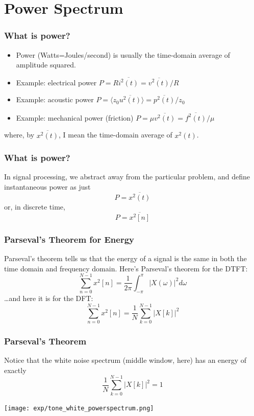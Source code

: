 \documentclass{beamer}
\begin{document}
\section[Power]{Power Spectrum}
\setcounter{subsection}{1}

\begin{frame}
  \frametitle{What is power?}

  \begin{itemize}
    \item Power (Watts=Joules/second) is usually the time-domain
      average of amplitude squared.
    \item Example: electrical power $P=R\overline{i^2(t)} = \overline{v^2(t)}/R$
    \item Example: acoustic power $P=\langle z_0 \overline{u^2(t)}\rangle = \overline{p^2(t)}/z_0$
    \item Example: mechanical power (friction) $P= \mu\overline{v^2(t)} = \overline{f^2(t)}/\mu$
  \end{itemize}
  where, by $\overline{x^2(t)}$, I mean the time-domain average of $x^2(t)$.
\end{frame}

\begin{frame}
  \frametitle{What is power?}

  In signal processing, we abstract away from the particular problem,
  and define instantaneous power as just
  \[
  P = \overline{x^2(t)}
  \]
  or, in  discrete time,
  \[
  P = \overline{x^2[n]}
  \]
\end{frame}
  
\begin{frame}
  \frametitle{Parseval's Theorem for Energy}

  Parseval's theorem tells us that the energy of a signal is the same
  in both the time domain and frequency domain.  Here's Parseval's
  theorem for the DTFT:
  \[
  \sum_{n=0}^{N-1}x^2[n] = \frac{1}{2\pi}\int_{-\pi}^{\pi}\left|X(\omega)\right|^2d\omega
  \]
  \ldots and here it is for the DFT:
  \[
  \sum_{n=0}^{N-1}x^2[n] = \frac{1}{N}\sum_{k=0}^{N-1}\left|X[k]\right|^2
  \]  
\end{frame}

\begin{frame}
  \frametitle{Parseval's Theorem}

  Notice that the white noise spectrum (middle window, here) has an energy of exactly
  \[
  \frac{1}{N}\sum_{k=0}^{N-1}\left|X[k]\right|^2 = 1
  \]
  
  \centerline{\texttt{[image: exp/tone\_white\_powerspectrum.png]}}
\end{frame}
\end{document}
